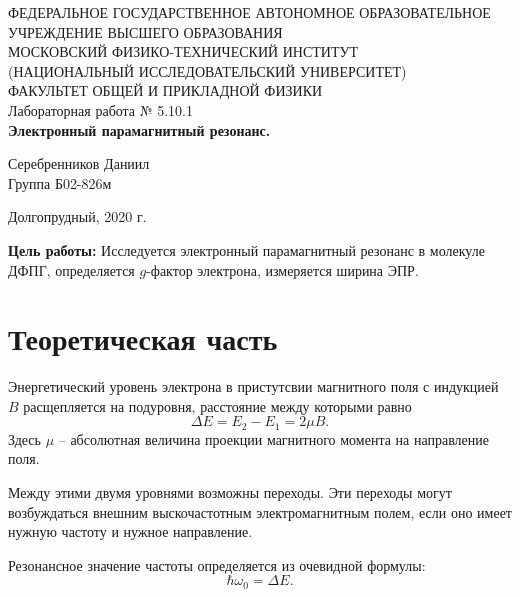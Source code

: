 \documentclass[a4paper,12pt]{article} %
\begin{document}
\begin{center}
	\footnotesize{ФЕДЕРАЛЬНОЕ ГОСУДАРСТВЕННОЕ АВТОНОМНОЕ ОБРАЗОВАТЕЛЬНОЕ 			УЧРЕЖДЕНИЕ ВЫСШЕГО ОБРАЗОВАНИЯ}\\
	\footnotesize{МОСКОВСКИЙ ФИЗИКО-ТЕХНИЧЕСКИЙ ИНСТИТУТ\\(НАЦИОНАЛЬНЫЙ 			ИССЛЕДОВАТЕЛЬСКИЙ УНИВЕРСИТЕТ)}\\
	\footnotesize{ФАКУЛЬТЕТ ОБЩЕЙ И ПРИКЛАДНОЙ ФИЗИКИ\\}
	\hfill \break
	\hfill\break
	\hfill\break
	\hfill \break
	\hfill \break
	\hfill \break
	\hfill \break
	\hfill \break
	\hfill \break
	\hfill \break
	\hfill \break
	\hfill \break
	\hfill \break
	\hfill \break
	\large{Лабораторная работа № 5.10.1 \\\textbf{Электронный парамагнитный резонанс.}}\\
	\hfill \break
	\hfill \break
	\hfill \break
	\begin{flushright}
		Серебренников Даниил\\
		Группа Б02-826м
	\end{flushright}
	\hfill \break
	\hfill \break
	\hfill \break
	\hfill \break
	\hfill \break
	\hfill \break
	\hfill \break
	\hfill \break
	\hfill \break
	\hfill \break
	\hfill \break
\end{center}
\begin{center}
	Долгопрудный, 2020 г.
\end{center}
\thispagestyle{empty}
\newpage
	\textbf{Цель работы:} Исследуется электронный парамагнитный резонанс в молекуле ДФПГ, определяется $g$-фактор электрона, измеряется ширина ЭПР.

\section{Теоретическая часть}
	Энергетический уровень электрона в пристутсвии магнитного поля с индукцией $B$ расщепляется на подуровня, расстояние между которыми равно 
	\begin{equation}
		\label{eq:dE}
		\Delta E = E_2 - E_1 = 2\mu B.
	\end{equation}
	Здесь $\mu$ -- абсолютная величина проекции магнитного момента на направление поля.
	
	Между этими двумя уровнями возможны переходы. Эти переходы могут возбуждаться внешним выскочастотным электромагнитным полем, если оно имеет нужную частоту и нужное направление.
	
	Резонансное значение частоты определяется из очевидной формулы:
	\begin{equation}
		\label{eq:resonans_omega}
		\hbar \omega_0 = \Delta E.
	\end{equation}
\end{document}

